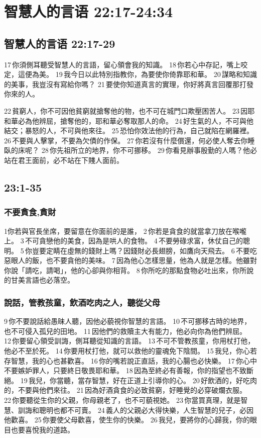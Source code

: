\section{智慧人的言语 22:17-24:34}
\subsection{智慧人的言语 22:17-29}
17 你須側耳聽受智慧人的言語，留心領會我的知識。 18 你若心中存記，嘴上咬定，這便為美。 19 我今日以此特別指教你，為要使你倚靠耶和華。 20 謀略和知識的美事，我豈沒有寫給你嗎？ 21 要使你知道真言的實理，你好將真言回覆那打發你來的人。

22 貧窮人，你不可因他貧窮就搶奪他的物，也不可在城門口欺壓困苦人。 23 因耶和華必為他辨屈，搶奪他的，耶和華必奪取那人的命。 24 好生氣的人，不可與他結交；暴怒的人，不可與他來往。 25 恐怕你效法他的行為，自己就陷在網羅裡。 26 不要與人擊掌，不要為欠債的作保。 27 你若沒有什麼償還，何必使人奪去你睡臥的床呢？ 28 你先祖所立的地界，你不可挪移。 29 你看見辦事殷勤的人嗎？他必站在君王面前，必不站在下賤人面前。

\subsection{  23:1-35}
\subsubsection{不要貪食,貪財}
1你若與官長坐席，要留意在你面前的是誰， 2 你若是貪食的就當拿刀放在喉嚨上。 3 不可貪戀他的美食，因為是哄人的食物。 4 不要勞碌求富，休仗自己的聰明。 5 你豈要定睛在虛無的錢財上嗎？因錢財必長翅膀，如鷹向天飛去。 6 不要吃惡眼人的飯，也不要貪他的美味。 7 因為他心怎樣思量，他為人就是怎樣。他雖對你說「請吃，請喝」，他的心卻與你相背。 8 你所吃的那點食物必吐出來，你所說的甘美言語也必落空。

\subsubsection{說話，管教孩童，飲酒吃肉之人，聽從父母}
 9 你不要說話給愚昧人聽，因他必藐視你智慧的言語。 
10 不可挪移古時的地界，也不可侵入孤兒的田地。 11 因他們的救贖主大有能力，他必向你為他們辨屈。 
12 你要留心領受訓誨，側耳聽從知識的言語。 13 不可不管教孩童，你用杖打他，他必不至於死。 14 你要用杖打他，就可以救他的靈魂免下陰間。 15 我兒，你心若存智慧，我的心也甚歡喜。 16 你的嘴若說正直話，我的心腸也必快樂。 17 你心中不要嫉妒罪人，只要終日敬畏耶和華。 18 因為至終必有善報，你的指望也不致斷絕。 19 我兒，你當聽，當存智慧，好在正道上引導你的心。 20 好飲酒的，好吃肉的，不要與他們來往。 21 因為好酒貪食的必致貧窮，好睡覺的必穿破爛衣服。 22 你要聽從生你的父親，你母親老了，也不可藐視她。 23 你當買真理，就是智慧、訓誨和聰明也都不可賣。 24 義人的父親必大得快樂，人生智慧的兒子，必因他歡喜。 25 你要使父母歡喜，使生你的快樂。 26 我兒，要將你的心歸我，你的眼目也要喜悅我的道路。

